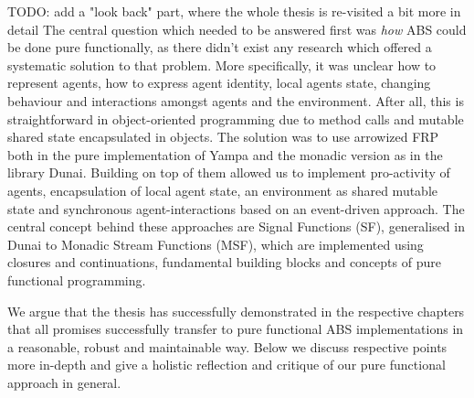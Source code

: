 TODO: add a "look back" part, where the whole thesis is re-visited a bit more in detail
The central question which needed to be answered first was \textit{how} ABS could be done pure functionally, as there didn't exist any research which offered a systematic solution to that problem. More specifically, it was unclear how to represent agents, how to express agent identity, local agents state, changing behaviour and interactions amongst agents and the environment. After all, this is straightforward in object-oriented programming due to method calls and mutable shared state encapsulated in objects.
The solution was to use arrowized FRP both in the pure implementation of Yampa and the monadic version as in the library Dunai. Building on top of them allowed us to implement pro-activity of agents, encapsulation of local agent state, an environment as shared mutable state and synchronous agent-interactions based on an event-driven approach. The central concept behind these approaches are Signal Functions (SF), generalised in Dunai to Monadic Stream Functions (MSF), which are implemented using closures and continuations, fundamental building blocks and concepts of pure functional programming. 


We argue that the thesis has successfully demonstrated in the respective chapters that all promises successfully transfer to pure functional ABS implementations in a reasonable, robust and maintainable way. Below we discuss respective points more in-depth and give a holistic reflection and critique of our pure functional approach in general.









